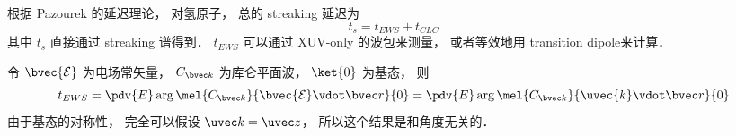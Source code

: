 
\begin{issues}
\issueDraft
\end{issues}


根据 Pazourek 的延迟理论， 对氢原子， 总的 streaking 延迟为
\begin{equation}
t_s = t_{EWS} + t_{CLC}
\end{equation}
其中 $t_s$ 直接通过 streaking 谱得到． $t_{EWS}$ 可以通过 XUV-only 的波包来测量， 或者等效地用 transition dipole来计算．

令 $\bvec{\mathcal E}$ 为电场常矢量， $C_{\bvec k}$ 为库仑平面波， $\ket{0}$ 为基态， 则
\begin{equation}
t_{EWS} = \pdv{E} \arg \mel{C_{\bvec k}}{\bvec{\mathcal E}\vdot \bvec r}{0} = \pdv{E} \arg \mel{C_{\bvec k}}{\uvec{k}\vdot \bvec r}{0}
\end{equation}
由于基态的对称性， 完全可以假设 $\uvec k = \uvec z$， 所以这个结果是和角度无关的．
